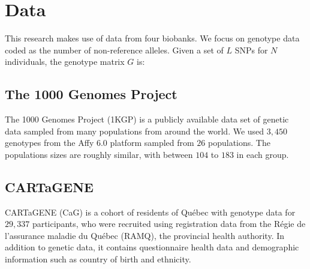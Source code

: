 
\citep{mcinnes_accelerated_2017}

\section{Data}

This research makes use of data from four biobanks. We focus on genotype data coded as the number of non-reference alleles. Given a set of $L$ SNPs for $N$ individuals, the genotype matrix $G$ is:

%    

\subsection{The 1000 Genomes Project}

The 1000 Genomes Project (1KGP) is a publicly available data set of genetic data sampled from many populations from around the world\citep{global_2015}. We used $3,450$ genotypes from the Affy 6.0 platform sampled from $26$  populations. The populations sizes are roughly similar, with between $104$ to $183$ in each group.

\subsection{CARTaGENE}

CARTaGENE (CaG) is a cohort of residents of Qu\'{e}bec with genotype data for $29,337$ participants, who were recruited using registration data from the R\'{e}gie de l’assurance maladie du Qu\'{e}bec (RAMQ), the provincial health authority\citep{awadalla_cohort_2013}. In addition to genetic data, it contains questionnaire health data and demographic information such as country of birth and ethnicity.

